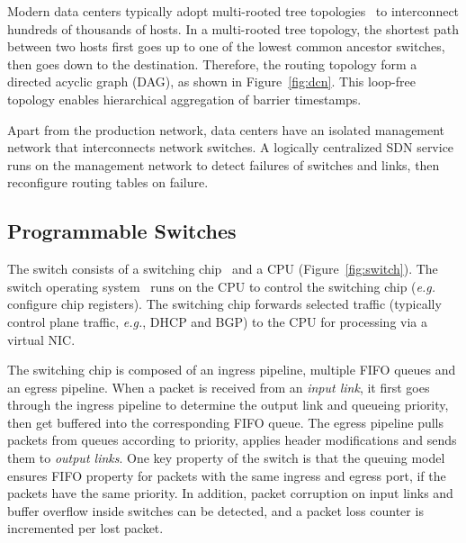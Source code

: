 Modern data centers typically adopt multi-rooted tree topologies~\cite{leiserson1985fat,greenberg2009vl2} to interconnect hundreds of thousands of hosts. In a multi-rooted tree topology, the shortest path between two hosts first goes up to one of the lowest common ancestor switches, then goes down to the destination.
Therefore, the routing topology form a directed acyclic graph (DAG), as shown in Figure~\ref{fig:dcn}.
This loop-free topology enables hierarchical aggregation of barrier timestamps.

Apart from the production network, data centers have an isolated management network that interconnects network switches.
A logically centralized SDN service runs on the management network to detect failures of switches and links, then reconfigure routing tables on failure.


\subsection{Programmable Switches}
\label{sec:programmable-switches}
The switch consists of a switching chip~\cite{broadcom,tofino} and a CPU (Figure~\ref{fig:switch}). The switch operating system~\cite{arista-eos} runs on the CPU to control the switching chip (\textit{e.g.} configure chip registers). The switching chip forwards selected traffic (typically control plane traffic, \textit{e.g.}, DHCP and BGP) to the CPU for processing via a virtual NIC. 

The switching chip is composed of an ingress pipeline, multiple FIFO queues and an egress pipeline.
When a packet is received from an \textit{input link}, it first goes through the ingress pipeline to determine the output link and queueing priority, then get buffered into the corresponding FIFO queue.
The egress pipeline pulls packets from queues according to priority, applies header modifications and sends them to \textit{output links}.
One key property of the switch is that the queuing model ensures FIFO property for packets with the same ingress and egress port, 
if the packets have the same priority. In addition, packet corruption on input links and buffer overflow inside switches can be detected, and a packet loss counter is incremented per lost packet.

